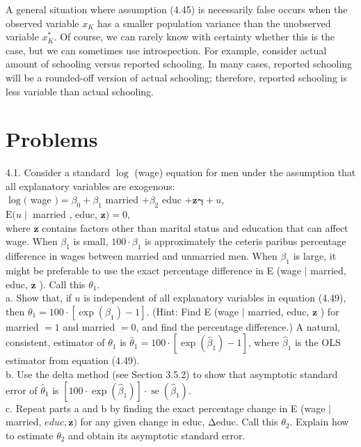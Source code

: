 \documentclass[10pt]{article}
\begin{document}
A general situation where assumption (4.45) is necessarily false occurs when the observed variable $x_{K}$ has a smaller population variance than the unobserved variable $x_{K}^{*}$. Of course, we can rarely know with certainty whether this is the case, but we can sometimes use introspection. For example, consider actual amount of schooling versus reported schooling. In many cases, reported schooling will be a rounded-off version of actual schooling; therefore, reported schooling is less variable than actual schooling.

\section*{Problems}
4.1. Consider a standard $\log$ (wage) equation for men under the assumption that all explanatory variables are exogenous:\\
$\log ($ wage $)=\beta_{0}+\beta_{1}$ married $+\beta_{2}$ educ $+\mathbf{z} \boldsymbol{\gamma}+u$,\\
$\mathrm{E}(u \mid$ married , educ, $\mathbf{z})=0$,\\
where $\mathbf{z}$ contains factors other than marital status and education that can affect wage. When $\beta_{1}$ is small, $100 \cdot \beta_{1}$ is approximately the ceteris paribus percentage difference in wages between married and unmarried men. When $\beta_{1}$ is large, it might be preferable to use the exact percentage difference in E (wage $\mid$ married, educ, $\mathbf{z}$ ). Call this $\theta_{1}$.\\
a. Show that, if $u$ is independent of all explanatory variables in equation (4.49), then $\theta_{1}=100 \cdot\left[\exp \left(\beta_{1}\right)-1\right]$. (Hint: Find E (wage $\mid$ married, educ, $\mathbf{z}$ ) for married $=1$ and married $=0$, and find the percentage difference.) A natural, consistent, estimator of $\theta_{1}$ is $\hat{\theta}_{1}=100 \cdot\left[\exp \left(\hat{\beta}_{1}\right)-1\right]$, where $\hat{\beta}_{1}$ is the OLS estimator from equation (4.49).\\
b. Use the delta method (see Section 3.5.2) to show that asymptotic standard error of $\hat{\theta}_{1}$ is $\left[100 \cdot \exp \left(\hat{\beta}_{1}\right)\right] \cdot \operatorname{se}\left(\hat{\beta}_{1}\right)$.\\
c. Repeat parts a and b by finding the exact percentage change in E (wage $\mid$ married, $e d u c, \mathbf{z})$ for any given change in educ, Δeduc. Call this $\theta_{2}$. Explain how to estimate $\theta_{2}$ and obtain its asymptotic standard error.\\
\end{document}
